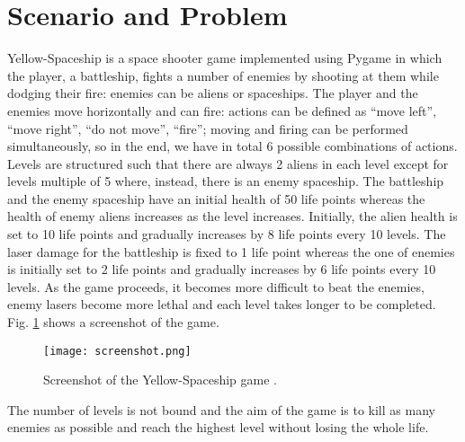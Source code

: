 \section{Scenario and Problem}
Yellow-Spaceship \cite{Yellow-Spaceship} is a space shooter game implemented using Pygame \cite{PyGame} in which the
player, a battleship, fights a number of enemies by shooting at them while dodging their fire:
enemies can be aliens or spaceships. The player and the enemies move horizontally and
can fire: actions can be defined as “move left”, “move right”, “do not move”, “fire”; moving
and firing can be performed simultaneously, so in the end, we have in total 6 possible
combinations of actions. Levels are structured such that there are always 2 aliens in
each level except for levels multiple of 5 where, instead, there is an enemy spaceship. The battleship
and the enemy spaceship have an initial health of 50 life points whereas the health of enemy
aliens increases as the level increases. Initially, the alien health is set to 10 life points and
gradually increases by 8 life points every 10 levels. The laser damage for the battleship is
fixed to 1 life point whereas the one of enemies is initially set to 2 life points and gradually
increases by 6 life points every 10 levels. As the game proceeds, it becomes more difficult
to beat the enemies, enemy lasers become more lethal and each level takes longer to be completed. 
Fig. \ref{fig:game_screenshot} shows a screenshot of the game.

\begin{figure}[ht]
\centerline{\texttt{[image: screenshot.png]}}
\caption{Screenshot of the Yellow-Spaceship game \cite{Yellow-Spaceship}.}
\label{fig:game_screenshot}
\end{figure}

The number of levels is not bound and the aim of the game is to kill as many enemies as
possible and reach the highest level without losing the whole life.
